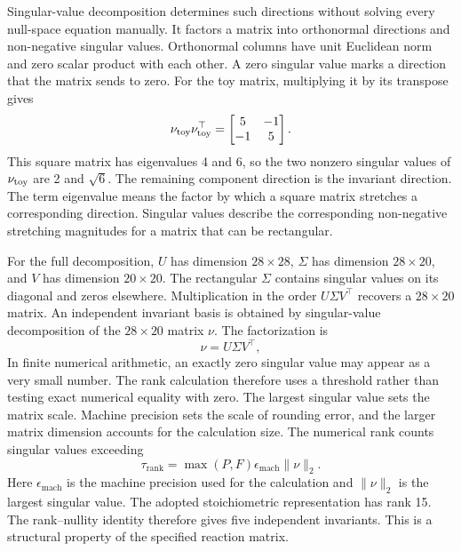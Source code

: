 Singular-value decomposition determines such directions without solving every null-space equation manually. It factors a matrix into orthonormal directions and non-negative singular values. Orthonormal columns have unit Euclidean norm and zero scalar product with each other. A zero singular value marks a direction that the matrix sends to zero. For the toy matrix, multiplying it by its transpose gives
\[
\nu_{\rm toy}\nu_{\rm toy}^\top
=\begin{bmatrix}5&-1\\-1&5\end{bmatrix}.
\]
This square matrix has eigenvalues 4 and 6, so the two nonzero singular values of $\nu_{\rm toy}$ are 2 and $\sqrt6$. The remaining component direction is the invariant direction. The term eigenvalue means the factor by which a square matrix stretches a corresponding direction. Singular values describe the corresponding non-negative stretching magnitudes for a matrix that can be rectangular.

For the full decomposition, $U$ has dimension $28\times28$, $\Sigma$ has dimension $28\times20$, and $V$ has dimension $20\times20$. The rectangular $\Sigma$ contains singular values on its diagonal and zeros elsewhere. Multiplication in the order $U\Sigma V^\top$ recovers a $28\times20$ matrix. An independent invariant basis is obtained by singular-value decomposition of the $28\times20$ matrix $\nu$. The factorization is
\begin{equation}
\nu=U\Sigma V^\top,
\label{eq:stoichiometric_svd}
\end{equation}
In finite numerical arithmetic, an exactly zero singular value may appear as a very small number. The rank calculation therefore uses a threshold rather than testing exact numerical equality with zero. The largest singular value sets the matrix scale. Machine precision sets the scale of rounding error, and the larger matrix dimension accounts for the calculation size. The numerical rank counts singular values exceeding
\begin{equation}
\tau_{\mathrm{rank}}=\max(P,F)\epsilon_{\mathrm{mach}}\|\nu\|_2.
\label{eq:stoichiometric_rank_threshold}
\end{equation}
Here $\epsilon_{\mathrm{mach}}$ is the machine precision used for the calculation and $\|\nu\|_2$ is the largest singular value. The adopted stoichiometric representation has rank 15. The rank--nullity identity therefore gives five independent invariants. This is a structural property of the specified reaction matrix.


